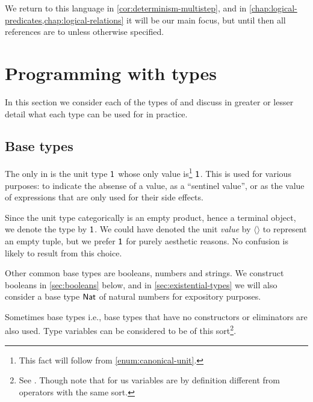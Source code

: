 We return to this language in \cref{cor:determinism-multistep}, and in \cref{chap:logical-predicates,chap:logical-relations} it will be our main focus, but until then all references are to \langrecref{} unless otherwise specified.


\section{Programming with types}

In this section we consider each of the types of \langrecref{} and discuss in greater or lesser detail what each type can be used for in practice.


\subsection{Base types}

\newcommand{\typeNat}{\typ{Nat}}
\newcommand{\expZero}{\expr{0}}
\newcommand{\expSucc}[1]{\expr{succ}\expspace#1}
\newcommand{\expTuple}[1]{\langle#1\rangle}

The only  in \langrecref{} is the unit type $\mathsf{1}$ whose only value is\footnote{This fact will follow from \cref{enum:canonical-unit}.} $\mathsf{1}$. This is used for various purposes: to indicate the absense of a value, as a \enquote{sentinel value}, or as the value of expressions that are only used for their side effects.

Since the unit type categorically is an empty product, hence a terminal object, we denote the type by $\mathsf{1}$. We could have denoted the unit \emph{value} by $\langle\rangle$ to represent an empty tuple, but we prefer $\mathsf{1}$ for purely aesthetic reasons. No confusion is likely to result from this choice.

Other common base types are booleans, numbers and strings. We construct booleans in \cref{sec:booleans} below, and in \cref{sec:existential-types} we will also consider a base type $\typeNat$ of natural numbers for expository purposes.

Sometimes  base types \textdash i.e., base types that have no constructors or eliminators \textdash are also used. Type variables can be considered to be of this sort\footnote{See \textcite[§22.1]{pierce-types}. Though note that for us variables are by definition different from operators with the same sort.}.


